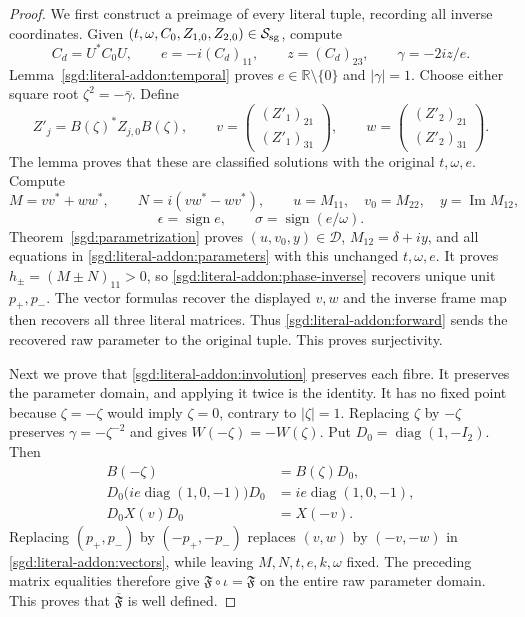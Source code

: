 \begin{proof}
We first construct a preimage of every literal tuple, recording all
inverse coordinates. Given
$(t,\omega,C_0,Z_{1,0},Z_{2,0})\in\mathcal S_{\rm sg}$, compute
\[
 C_d=U^*C_0U,\qquad
 e=-i(C_d)_{11},\qquad z=(C_d)_{23},\qquad
 \gamma=-2iz/e.
\]
Lemma~\ref{sgd:literal-addon:temporal} proves $e\in\mathbb R\setminus\{0\}$
and $|\gamma|=1$. Choose either square root
$\zeta^2=-\bar\gamma$. Define
\[
 Z'_j=B(\zeta)^*Z_{j,0}B(\zeta),\qquad
 v=\begin{pmatrix}(Z'_1)_{21}\\(Z'_1)_{31}\end{pmatrix},\qquad
 w=\begin{pmatrix}(Z'_2)_{21}\\(Z'_2)_{31}\end{pmatrix}.
\]
The lemma proves that these are classified solutions with the original
$t,\omega,e$. Compute
\[
 M=vv^*+ww^*,\qquad N=i(vw^*-wv^*),\qquad
 u=M_{11},\quad v_0=M_{22},\quad y=\operatorname{Im}M_{12},
\]
\[
 \epsilon=\operatorname{sign}e,\qquad
 \sigma=\operatorname{sign}(e/\omega).
\]
Theorem~\ref{sgd:parametrization} proves
$(u,v_0,y)\in\mathcal D$, $M_{12}=\delta+iy$, and all equations
in \eqref{sgd:literal-addon:parameters} with this unchanged
$t,\omega,e$. It proves $h_\pm=(M\pm N)_{11}>0$, so
\eqref{sgd:literal-addon:phase-inverse} recovers unique unit
$p_+,p_-$. The vector formulas recover the displayed $v,w$
and the inverse frame map then recovers all three literal matrices.
Thus \eqref{sgd:literal-addon:forward} sends the recovered raw
parameter to the original tuple. This proves surjectivity.

Next we prove that \eqref{sgd:literal-addon:involution} preserves
each fibre. It preserves the parameter domain, and applying it
twice is the identity. It has no fixed point because
$\zeta=-\zeta$ would imply $\zeta=0$, contrary to $|\zeta|=1$.
Replacing $\zeta$ by $-\zeta$ preserves $\gamma=-\zeta^{-2}$ and
gives $W(-\zeta)=-W(\zeta)$. Put
$D_0=\operatorname{diag}(1,-I_2)$. Then
 \begin{align*}
 B(-\zeta)&=B(\zeta)D_0,\\
 D_0\bigl(ie\operatorname{diag}(1,0,-1)\bigr)D_0
 &=ie\operatorname{diag}(1,0,-1),\\
 D_0X(v)D_0&=X(-v).
 \end{align*}
Replacing $(p_+,p_-)$ by $(-p_+,-p_-)$ replaces $(v,w)$ by
$(-v,-w)$ in \eqref{sgd:literal-addon:vectors}, while leaving
$M,N,t,e,k,\omega$ fixed. The preceding matrix equalities
therefore give $\mathfrak F\circ\iota=\mathfrak F$ on the entire
raw parameter domain. This proves that $\overline{\mathfrak F}$
is well defined.


\end{proof}
